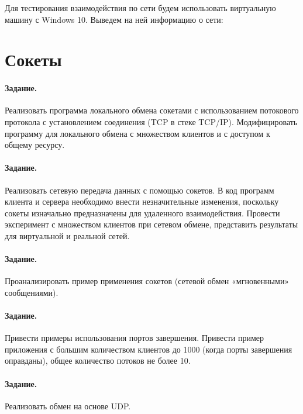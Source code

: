 



Для тестирования взаимодействия по сети будем использовать виртуальную машину с Windows 10. Выведем на ней информацию о сети:



\section{Сокеты}

\paragraph{Задание.} Реализовать программа локального обмена сокетами с использованием потокового протокола с установлением соединения (TCP в стеке TCP/IP). Модифицировать программу для локального обмена с множеством клиентов и с доступом к общему ресурсу.

\paragraph{Задание.}  Реализовать сетевую передача данных с помощью сокетов. В код программ клиента и сервера необходимо внести незначительные изменения, поскольку сокеты изначально предназначены для удаленного взаимодействия. Провести эксперимент с множеством клиентов при сетевом обмене, представить результаты для виртуальной и реальной сетей.

\paragraph{Задание.} Проанализировать пример применения сокетов (сетевой обмен «мгновенными» сообщениями).

\paragraph{Задание.} Привести примеры использования портов завершения. Привести пример приложения с большим количеством клиентов до 1000 (когда порты завершения оправданы), общее количество потоков не более 10.

\paragraph{Задание.} Реализовать обмен на основе UDP.


